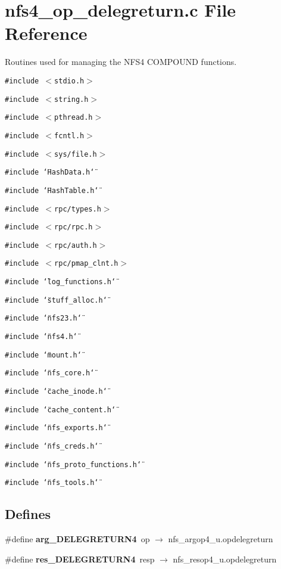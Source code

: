 \section{nfs4\_\-op\_\-delegreturn.c File Reference}
\label{nfs4__op__delegreturn_8c}
Routines used for managing the NFS4 COMPOUND functions. 

{\tt \#include $<$stdio.h$>$}\par
{\tt \#include $<$string.h$>$}\par
{\tt \#include $<$pthread.h$>$}\par
{\tt \#include $<$fcntl.h$>$}\par
{\tt \#include $<$sys/file.h$>$}\par
{\tt \#include \char`\"{}Hash\-Data.h\char`\"{}}\par
{\tt \#include \char`\"{}Hash\-Table.h\char`\"{}}\par
{\tt \#include $<$rpc/types.h$>$}\par
{\tt \#include $<$rpc/rpc.h$>$}\par
{\tt \#include $<$rpc/auth.h$>$}\par
{\tt \#include $<$rpc/pmap\_\-clnt.h$>$}\par
{\tt \#include \char`\"{}log\_\-functions.h\char`\"{}}\par
{\tt \#include \char`\"{}stuff\_\-alloc.h\char`\"{}}\par
{\tt \#include \char`\"{}nfs23.h\char`\"{}}\par
{\tt \#include \char`\"{}nfs4.h\char`\"{}}\par
{\tt \#include \char`\"{}mount.h\char`\"{}}\par
{\tt \#include \char`\"{}nfs\_\-core.h\char`\"{}}\par
{\tt \#include \char`\"{}cache\_\-inode.h\char`\"{}}\par
{\tt \#include \char`\"{}cache\_\-content.h\char`\"{}}\par
{\tt \#include \char`\"{}nfs\_\-exports.h\char`\"{}}\par
{\tt \#include \char`\"{}nfs\_\-creds.h\char`\"{}}\par
{\tt \#include \char`\"{}nfs\_\-proto\_\-functions.h\char`\"{}}\par
{\tt \#include \char`\"{}nfs\_\-tools.h\char`\"{}}\par
\subsection*{Defines}
\begin{CompactItemize}
\item 
\#define {\bf arg\_\-DELEGRETURN4}\ op $\rightarrow$ nfs\_\-argop4\_\-u.opdelegreturn
\item 
\#define {\bf res\_\-DELEGRETURN4}\ resp $\rightarrow$ nfs\_\-resop4\_\-u.opdelegreturn
\end{CompactItemize}
